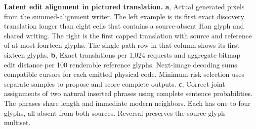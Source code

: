 \textbf{Latent edit alignment in pictured translation.}
\textbf{a}, Actual generated pixels from the summed-alignment writer. The left example is its first exact discovery translation longer than eight cells that contains a source-absent Han glyph and shared writing. The right is the first capped translation with source and reference of at most fourteen glyphs. The single-path row in that column shows its first sixteen glyphs.
\textbf{b}, Exact translations per 1,024 requests and aggregate bitmap edit distance per 100 renderable reference glyphs. Next-image decoding sums compatible cursors for each emitted physical code. Minimum-risk selection uses separate samples to propose and score complete outputs.
\textbf{c}, Correct joint assignments of two natural inserted phrases using complete sentence probabilities. The phrases share length and immediate modern neighbors. Each has one to four glyphs, all absent from both sources. Reversal preserves the source glyph multiset.
